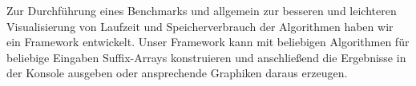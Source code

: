 Zur  Durchführung eines Benchmarks und allgemein zur besseren und leichteren Visualisierung von Laufzeit und Speicherverbrauch der Algorithmen haben wir ein Framework entwickelt. Unser Framework kann mit beliebigen Algorithmen für beliebige Eingaben Suffix-Arrays konstruieren und anschließend die Ergebnisse in der Konsole ausgeben oder ansprechende Graphiken daraus erzeugen.